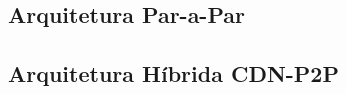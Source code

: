 \documentclass[
	12pt,				%
	oneside,			%
	a4paper,			%
	english,			%
	brazil				%
	]{abntex2ppgsi}
\begin{document}


\subsection{Arquitetura Par-a-Par}


\subsection{Arquitetura Híbrida CDN-P2P}



\end{document}
